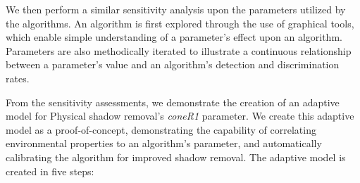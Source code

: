 \documentclass[12pt]{report}
\begin{document}
We then perform a similar sensitivity analysis upon the parameters utilized by the algorithms. An algorithm is first explored through the use of graphical tools, which enable simple understanding of a parameter's effect upon an algorithm. Parameters are also methodically iterated to illustrate a continuous relationship between a parameter's value and an algorithm's detection and discrimination rates.

From the sensitivity assessments, we demonstrate the creation of an adaptive model for Physical shadow removal's \textit{coneR1} parameter. We create this adaptive model as a proof-of-concept, demonstrating the capability of correlating environmental properties to an algorithm's parameter, and automatically calibrating the algorithm for improved shadow removal. The adaptive model is created in five steps:

\end{document}
